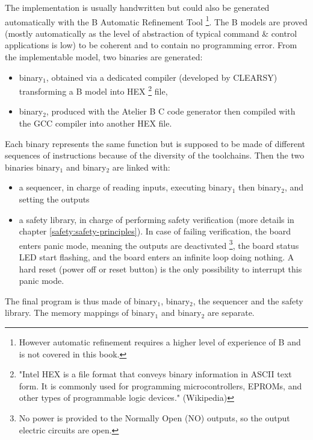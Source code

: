 The implementation is usually handwritten but could also be generated automatically with the B Automatic Refinement Tool \footnote{However automatic refinement requires a higher level of experience of B and is not covered in this book.}. The B models are proved (mostly automatically as the level of abstraction of typical command \& control applications is low) to be coherent and to contain no programming error.
From the implementable model, two binaries are generated:
\begin{itemize}
    \item binary$_1$, obtained via a dedicated compiler (developed by CLEARSY) transforming a B model into HEX \footnote{"Intel HEX is a file format that conveys binary information in ASCII text form. It is commonly used for programming microcontrollers, EPROMs, and other types of programmable logic devices." (Wikipedia)} file,
    \item binary$_2$, produced with the Atelier B C code generator then compiled with the GCC compiler into another HEX file.
\end{itemize} 
Each binary represents the same function but is supposed to be made of different sequences of instructions because of the diversity of the toolchains. 
Then the two binaries binary$_1$ and binary$_2$ are linked with:
\begin{itemize}
    \item a sequencer, in charge of reading inputs, executing binary$_1$ then binary$_2$, and setting the outputs
    \item a safety library, in charge of performing safety verification (more details in chapter \ref{safety:safety-principles}). In case of failing verification, the board enters panic mode, meaning the outputs are deactivated \footnote{No power is provided to the Normally Open (NO) outputs, so the output electric circuits are open.}, the board status LED start flashing, and the board enters an infinite loop doing nothing. A hard reset (power off or reset button) is the only possibility to interrupt this panic mode.
\end{itemize}
The final program is thus made of binary$_1$, binary$_2$, the sequencer and the safety library. The memory mappings of binary$_1$ and binary$_2$ are separate. 

